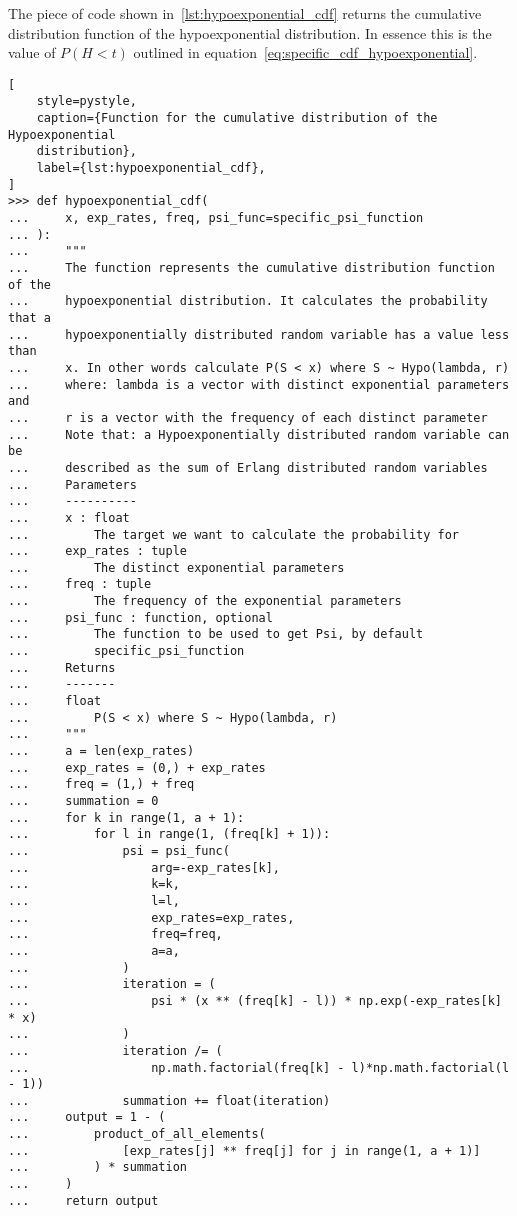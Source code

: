 The piece of code shown in~\ref{lst:hypoexponential_cdf} returns the cumulative
distribution function of the hypoexponential distribution.
In essence this is the value of \(P(H<t)\) outlined in
equation~\eqref{eq:specific_cdf_hypoexponential}.

\begin{lstlisting}[
    style=pystyle,
    caption={Function for the cumulative distribution of the Hypoexponential
    distribution},
    label={lst:hypoexponential_cdf},
]
>>> def hypoexponential_cdf(
...     x, exp_rates, freq, psi_func=specific_psi_function
... ):
...     """
...     The function represents the cumulative distribution function of the
...     hypoexponential distribution. It calculates the probability that a
...     hypoexponentially distributed random variable has a value less than
...     x. In other words calculate P(S < x) where S ~ Hypo(lambda, r)
...     where: lambda is a vector with distinct exponential parameters and 
...     r is a vector with the frequency of each distinct parameter
...     Note that: a Hypoexponentially distributed random variable can be
...     described as the sum of Erlang distributed random variables
...     Parameters
...     ----------
...     x : float
...         The target we want to calculate the probability for
...     exp_rates : tuple
...         The distinct exponential parameters
...     freq : tuple
...         The frequency of the exponential parameters
...     psi_func : function, optional
...         The function to be used to get Psi, by default
...         specific_psi_function
...     Returns
...     -------
...     float
...         P(S < x) where S ~ Hypo(lambda, r)
...     """
...     a = len(exp_rates)
...     exp_rates = (0,) + exp_rates
...     freq = (1,) + freq
...     summation = 0
...     for k in range(1, a + 1):
...         for l in range(1, (freq[k] + 1)):
...             psi = psi_func(
...                 arg=-exp_rates[k],
...                 k=k,
...                 l=l,
...                 exp_rates=exp_rates,
...                 freq=freq,
...                 a=a,
...             )
...             iteration = (
...                 psi * (x ** (freq[k] - l)) * np.exp(-exp_rates[k] * x)
...             )
...             iteration /= (
...                 np.math.factorial(freq[k] - l)*np.math.factorial(l - 1))
...             summation += float(iteration)
...     output = 1 - (
...         product_of_all_elements(
...             [exp_rates[j] ** freq[j] for j in range(1, a + 1)]
...         ) * summation
...     )
...     return output

\end{lstlisting}

